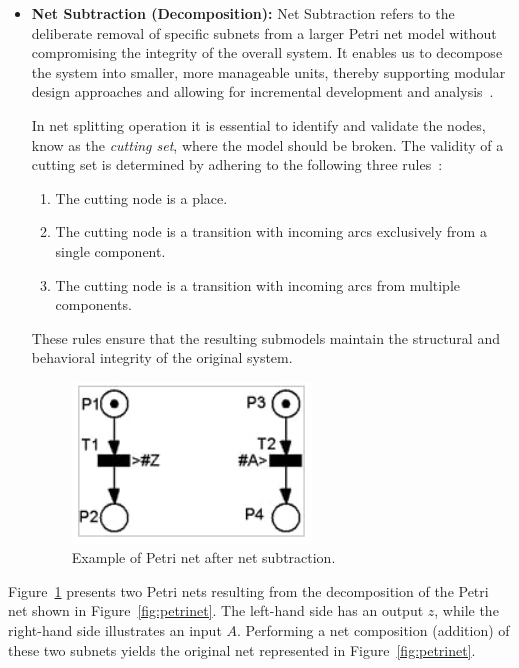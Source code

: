 \begin{itemize}
    \item \textbf{Net Subtraction (Decomposition): }     
Net Subtraction refers to the deliberate removal of specific subnets from a larger Petri net model without compromising the integrity of the overall system. It enables us to decompose the system into smaller, more manageable units, thereby supporting modular design approaches and  allowing for incremental development and analysis~\cite{Barrosadd}. 


In net splitting operation it is essential to identify and validate the nodes, know as the \emph{cutting set}, where the model should be broken. The validity of a cutting set is determined by adhering to the following three rules~\cite{apresentacao}:

\begin{enumerate}
    \item The cutting node is a place.
    \item The cutting node is a transition with incoming arcs exclusively from a single component.
    \item The cutting node is a transition with incoming arcs from multiple components.
\end{enumerate}

These rules ensure that the resulting submodels maintain the structural and behavioral integrity of the original system.



\begin{figure}[htbp]
  \centering
  \includegraphics[width=0.6\textwidth]{Chapters/Figures/petrisplit.jpg}
  \caption{Example of Petri net after net subtraction.}
  \label{fig:petrisplit}
\end{figure}


\end{itemize}


Figure~\ref{fig:petrisplit} presents two Petri nets resulting from the decomposition of the Petri net shown in Figure~\ref{fig:petrinet}. The left-hand side has an output \( z \), while the right-hand side illustrates an input \( A \). Performing a net composition (addition) of these two subnets yields the original net represented in Figure~\ref{fig:petrinet}.


